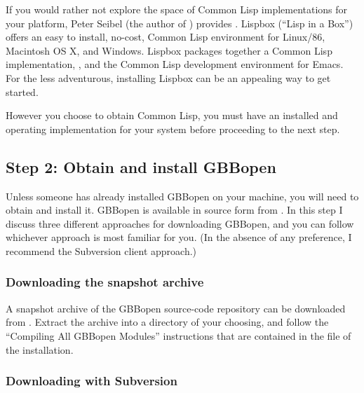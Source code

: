 \documentclass[10pt,twoside,english,pdftex]{article}
\begin{document}
If you would rather not explore the space of Common Lisp implementations for
your platform, Peter Seibel (the author of ) provides
.  Lispbox
(``Lisp in a Box'') offers an easy to install, no-cost, Common Lisp
environment for Linux/86, Macintosh OS X, and Windows.  Lispbox packages
together a Common Lisp implementation,
, and the
 Common Lisp
development environment for Emacs.  For the less adventurous, installing
Lispbox can be an appealing way to get started.

However you choose to obtain Common Lisp, you must have an installed and
operating implementation for your system before proceeding to the next step.

\subsection*{Step 2: Obtain and install GBBopen}

%
%
Unless someone has already installed GBBopen on your machine, you will need to
obtain and install it.  GBBopen is available in source form from
. In this
step I discuss three different approaches for downloading GBBopen, and you can
follow whichever approach is most familiar for you.  (In the absence of any
preference, I recommend the Subversion client approach.)

\subsubsection*{Downloading the snapshot archive}

A snapshot archive of the GBBopen source-code repository can be downloaded
from
.
Extract the archive into a directory of your choosing, and follow the
``Compiling All GBBopen Modules'' instructions that are contained in the
 file of the installation.

\subsubsection*{Downloading with Subversion}
\end{document}
